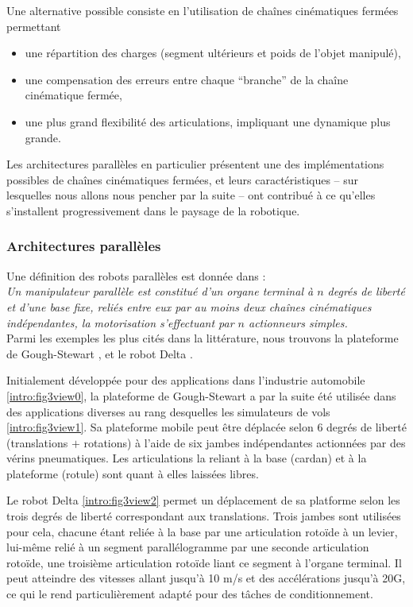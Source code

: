Une alternative possible consiste en l'utilisation de chaînes cinématiques fermées permettant
\begin{itemize}
 \item une répartition des charges (segment ultérieurs et poids de l'objet manipulé),
 \item une compensation des erreurs entre chaque ``branche'' de la chaîne cinématique fermée,
 \item une plus grand flexibilité des articulations, impliquant une dynamique plus grande.
\end{itemize}

Les architectures parallèles en particulier présentent une des implémentations possibles de chaînes cinématiques fermées, et leurs caractéristiques -- sur lesquelles nous allons nous pencher par la suite -- ont contribué à ce qu'elles s'installent progressivement dans le paysage de la robotique.


\subsubsection{Architectures parallèles}

Une définition des robots parallèles est donnée dans \cite{merlet1997robots} :\\
{\it Un manipulateur parallèle est constitué d’un organe terminal à $n$ degrés de liberté et d’une base fixe, reliés entre eux par au moins deux chaînes
cinématiques indépendantes, la motorisation s’effectuant par $n$ actionneurs simples.}\\

Parmi les exemples les plus cités dans la littérature, nous trouvons la plateforme de Gough-Stewart \cite{1956:Gough}, \cite{1965:Stewart} et le robot Delta \cite{1988:Clavel}.

Initialement développée pour des applications dans l'industrie automobile \ref{intro:fig3view0}, la plateforme de Gough-Stewart a par la suite été utilisée dans des applications diverses au rang desquelles les simulateurs de vols \ref{intro:fig3view1}. Sa plateforme mobile peut être déplacée selon 6 degrés de liberté (translations $+$ rotations) à l'aide de six jambes indépendantes actionnées par des vérins pneumatiques. Les articulations la reliant à la base (cardan) et à la plateforme (rotule) sont quant à elles laissées libres.

Le robot Delta \ref{intro:fig3view2} permet un déplacement de sa platforme selon les trois degrés de liberté correspondant aux translations. Trois jambes sont utilisées pour cela, chacune étant reliée à la base par une articulation rotoïde à un levier, lui-même relié à un segment parallélogramme par une seconde articulation rotoïde, une troisième articulation rotoïde liant ce segment à l'organe terminal. Il peut atteindre des vitesses allant jusqu'à 10 m/s et des accélérations jusqu'à 20G, ce qui le rend particulièrement adapté pour des tâches de conditionnement. 


